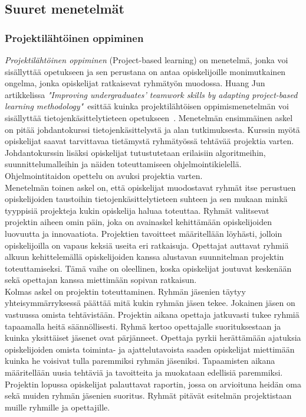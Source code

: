\documentclass[finnish]{../tktltiki2}
\theoremstyle{definition}
\theoremstyle{remark}
\begin{document}
\subsection{Suuret menetelmät}

\subsubsection{Projektilähtöinen oppiminen}

\emph{Projektilähtöinen oppiminen} (Project-based learning) on menetelmä, jonka voi sisällyttää opetukseen ja sen perustana on
antaa opiskelijoille monimutkainen ongelma, jonka opiskelijat
ratkaisevat ryhmätyön muodossa.
Huang Jun artikkelissa \emph{"Improving undergraduates' teamwork skills by adapting project-based
learning methodology"}~esittää kuinka projektilähtöisen oppimismenetelmän voi
sisällyttää tietojenkäsittelytieteen opetukseen~\cite{5593527}.
Menetelmän ensimmäinen askel on
pitää johdantokurssi tietojenkäsittelystä ja alan tutkimuksesta.
Kurssin myötä opiskelijat saavat tarvittavaa tietämystä ryhmätyössä tehtävää projektia
varten. Johdantokurssin lisäksi opiskelijat tutustutetaan erilaisiin algoritmeihin,
suunnittelumalleihin ja näiden toteuttamiseen ohjelmointikielellä. Ohjelmointitaidon
opettelu on avuksi projektia varten.\\

Menetelmän toinen askel on, että opiskelijat muodostavat ryhmät itse perustuen opiskelijoiden
taustoihin tietojenkäsittelytieteen suhteen ja sen mukaan minkä tyyppisiä projekteja kukin
opiskelija haluaa toteuttaa. Ryhmät valitsevat projektin aiheen omin päin, joka on avainaskel
kehittämään opiskelijoiden luovuutta ja innovaatiota. Projektien tavoitteet määritellään
löyhästi, jolloin opiskelijoilla on vapaus keksiä useita eri ratkaisuja. Opettajat auttavat
ryhmiä alkuun kehittelemällä opiskelijoiden kanssa alustavan suunnitelman projektin toteuttamiseksi.
Tämä vaihe on oleellinen, koska opiskelijat joutuvat keskenään sekä opettajan kanssa miettimään
sopivan ratkaisun.\\

Kolmas askel on projektin toteuttaminen. Ryhmän jäsenien täytyy yhteisymmärryksessä päättää mitä
kukin ryhmän jäsen tekee. Jokainen jäsen on vastuussa omista tehtävistään. Projektin aikana
opettaja jatkuvasti tukee ryhmiä tapaamalla heitä säännöllisesti. Ryhmä kertoo opettajalle
suorituksestaan ja kuinka yksittäiset jäsenet ovat pärjänneet. Opettaja pyrkii herättämään
ajatuksia opiskelijoiden omista toiminta- ja ajattelutavoista saaden opiskelijat miettimään
kuinka he voisivat tulla paremmiksi ryhmän jäseniksi. Tapaamisten aikana määritellään uusia
tehtäviä ja tavoitteita ja muokataan edellisiä paremmiksi. Projektin lopussa opiskelijat palauttavat raportin, jossa on arvioituna heidän oma sekä
muiden ryhmän jäsenien suoritus. Ryhmät pitävät esitelmän projektistaan muille ryhmille
ja opettajille.\\
\end{document}
